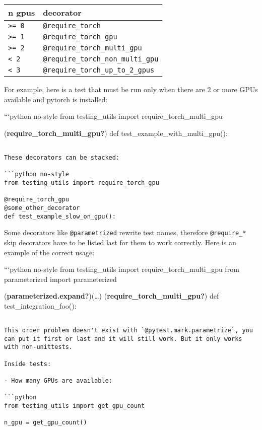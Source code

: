 \documentclass[
]{report}
\begin{document}
\begin{longtable}[]{@{}ll@{}}
\toprule\noalign{}
n gpus & decorator \\
\midrule\noalign{}
\endhead
\bottomrule\noalign{}
\endlastfoot
\texttt{\textgreater{}=\ 0} & \texttt{@require\_torch} \\
\texttt{\textgreater{}=\ 1} & \texttt{@require\_torch\_gpu} \\
\texttt{\textgreater{}=\ 2} & \texttt{@require\_torch\_multi\_gpu} \\
\texttt{\textless{}\ 2} & \texttt{@require\_torch\_non\_multi\_gpu} \\
\texttt{\textless{}\ 3} & \texttt{@require\_torch\_up\_to\_2\_gpus} \\
\end{longtable}

For example, here is a test that must be run only when there are 2 or
more GPUs available and pytorch is installed:

```python no-style from testing\_utils import require\_torch\_multi\_gpu

(\textbf{require\_torch\_multi\_gpu?}) def
test\_example\_with\_multi\_gpu():

\begin{verbatim}

These decorators can be stacked:

```python no-style
from testing_utils import require_torch_gpu

@require_torch_gpu
@some_other_decorator
def test_example_slow_on_gpu():
\end{verbatim}

Some decorators like \texttt{@parametrized} rewrite test names,
therefore \texttt{@require\_*} skip decorators have to be listed last
for them to work correctly. Here is an example of the correct usage:

```python no-style from testing\_utils import require\_torch\_multi\_gpu
from parameterized import parameterized

(\textbf{parameterized.expand?})(\ldots)
(\textbf{require\_torch\_multi\_gpu?}) def test\_integration\_foo():

\begin{verbatim}

This order problem doesn't exist with `@pytest.mark.parametrize`, you can put it first or last and it will still work. But it only works with non-unittests.

Inside tests:

- How many GPUs are available:

```python
from testing_utils import get_gpu_count

n_gpu = get_gpu_count()
\end{verbatim}
\end{document}
